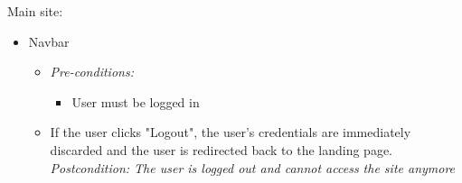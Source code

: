 \documentclass{article}
\begin{document}
			Main site:
			\begin{itemize}
				\item Navbar
				\begin{itemize}
					\item \textit{Pre-conditions:}
						\begin{itemize}
							\item User must be logged in
						\end{itemize}
					\item If the user clicks "Logout", the user's credentials are immediately discarded and the user is redirected back to the landing page. \textit{Postcondition: The user is logged out and cannot access the site anymore}
				\end{itemize}
			\end{itemize}
\end{document}
